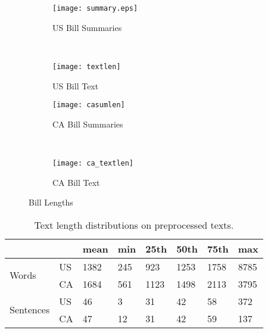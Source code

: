 \documentclass[11pt,a4paper]{article}
\begin{document}
\begin{figure}[h]
    \centering

    \begin{subfigure}[t]{.5\linewidth}
         \centering
        \texttt{[image: summary.eps]}
         \caption{US Bill Summaries}
         \label{fig:conlen:summary}
     \end{subfigure}~
         \begin{subfigure}[t]{.5\linewidth}
         \centering
        \texttt{[image: textlen]}
         \caption{US Bill Text}
         \label{fig:conlen:text}
     \end{subfigure}
    
     \begin{subfigure}[t]{.5\linewidth}
         \centering
        \texttt{[image: casumlen]}
         \caption{CA Bill Summaries}
         \label{fig:conlen:casum}
     \end{subfigure}~
    \begin{subfigure}[t]{.5\linewidth}
         \centering
        \texttt{[image: ca\_textlen]}
         \caption{CA Bill Text}
         \label{fig:conlen:catext}
     \end{subfigure}
    
     \caption{Bill Lengths}
    \label{fig:conlen}

\end{figure}


\begin{table*}[]
\centering
\begin{tabular}{ll|l|l|l|l|l|l|}
\cline{3-8}
                                                 &    & mean & min & 25th & 50th & 75th & max  \\ \hline
\multicolumn{1}{|l|}{\multirow{2}{*}{Words}}     & US & 1382 & 245 & 923  & 1253 & 1758 & 8785 \\ \cline{2-8} 
\multicolumn{1}{|l|}{}                           & CA & 1684 & 561 & 1123 & 1498 & 2113 & 3795 \\ \hline
\multicolumn{1}{|l|}{\multirow{2}{*}{Sentences}} & US & 46   & 3   & 31   & 42   & 58   & 372  \\ \cline{2-8} 
\multicolumn{1}{|l|}{}                           & CA & 47   & 12  & 31   & 42   & 59   & 137  \\ \hline
\end{tabular}
 \caption{Text length distributions on preprocessed texts.}
 \label{table:textlenclean}
\end{table*}
\end{document}
